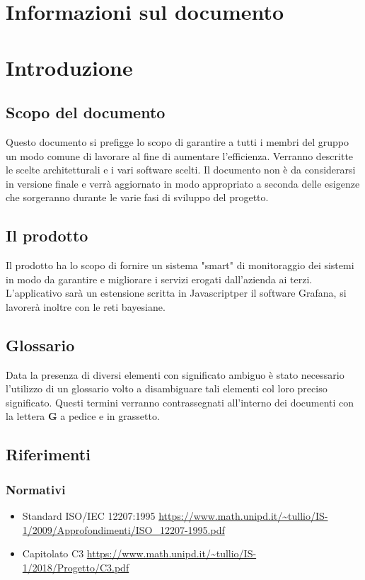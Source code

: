\section*{Informazioni sul documento}

\section{Introduzione}
    \subsection{Scopo del documento}
    	Questo documento si prefigge lo scopo di garantire a tutti i membri del gruppo un modo comune di lavorare al fine di aumentare l'efficienza\pedice. Verranno descritte le scelte architetturali e i vari software scelti. Il documento non è da considerarsi in versione finale e verrà aggiornato in modo appropriato a seconda delle esigenze che sorgeranno durante le varie fasi di sviluppo del progetto.
    \subsection{Il prodotto}
    	Il prodotto ha lo scopo di fornire un sistema "smart" di monitoraggio dei sistemi in modo da garantire e migliorare i servizi erogati dall'azienda ai terzi. L'applicativo sarà un estensione scritta in Javascript\pedice per il software Grafana\pedice, si lavorerà inoltre con le reti bayesiane\pedice.
    \subsection{Glossario}
    	Data la presenza di diversi elementi con significato ambiguo è stato necessario l'utilizzo di un glossario volto a disambiguare tali elementi col loro preciso significato. Questi termini verranno contrassegnati all'interno dei documenti con la lettera \textbf{G} a pedice e in grassetto.
\subsection{Riferimenti}
    \subsubsection{Normativi}
	    \begin{itemize}
	        \item Standard ISO/IEC 12207:1995 \newline \url{https://www.math.unipd.it/~tullio/IS-1/2009/Approfondimenti/ISO_12207-1995.pdf}
	        \item Capitolato C3 \newline \url{https://www.math.unipd.it/~tullio/IS-1/2018/Progetto/C3.pdf}
	    \end{itemize}
